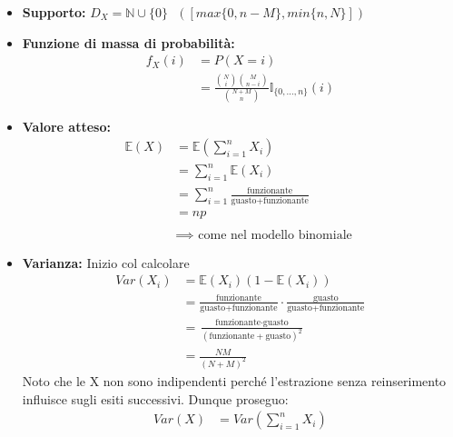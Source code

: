 \documentclass[11pt]{report}
\begin{document}
\begin{itemize}
	\item \textbf{Supporto:} $D_X=\mathbb{N} \cup \{0\}\ \ \ ([max \{ 0, n-M \}, min \{ n, N \}])$
    \item \textbf{Funzione di massa di probabilità:}
    \begin{equation}
        \begin{split}
            f_X(i) & = P(X = i)\\
            & = \frac{\binom{N}{i}\binom{M}{n-i}}{\binom{N+M}{n}} \mathbb{I}_{\{0, \dots ,n\}}(i)
        \end{split}
    \end{equation}
    \item \textbf{Valore atteso:}
    \begin{equation}
    	\begin{split}
   			\mathbb{E}(X) & = \mathbb{E} \left( \sum_{i=1}^n X_i \right)\\
            & = \sum_{i=1}^n \mathbb{E}(X_i)\\
            & = \sum_{i=1}^n \frac{\text{funzionante}}{\text{guasto} + \text{funzionante}}\\
            & = np\\\\
            & \implies \text{ come nel modello binomiale }
		\end{split}
    \end{equation}
    \item \textbf{Varianza:} Inizio col calcolare
    \begin{equation}
    	\begin{split}
   			Var(X_i) & = \mathbb{E}(X_i)(1 - \mathbb{E}(X_i))\\
            & = \frac{\text{funzionante}}{\text{guasto} + \text{funzionante}} \cdot \frac{\text{guasto}}{\text{guasto} + \text{funzionante}}\\
            & = \frac{\text{funzionante} \cdot \text{guasto}}{(\text{funzionante} + \text{guasto})^2}\\
            & = \frac{NM}{(N+M)^2}
        \end{split}
    \end{equation}
    Noto che le X non sono indipendenti perché l'estrazione senza reinserimento influisce sugli esiti successivi. Dunque proseguo:
    \begin{equation}
    	\begin{split}
   			Var(X) & = Var \left( \sum_{i=1}^n X_i \right)\\

\end{split}
\end{equation}
\end{itemize}
\end{document}
